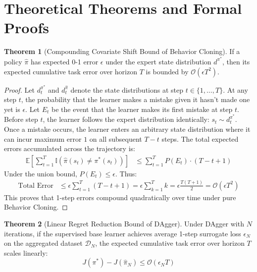 \documentclass[11pt,a4paper]{article}
\theoremstyle{definition}
\newtheorem{theorem}{\textbf{Theorem}}[section]
\begin{document}
\section{Theoretical Theorems and Formal Proofs}

\begin{theorem}[Compounding Covariate Shift Bound of Behavior Cloning]
If a policy $\hat{\pi}$ has expected 0-1 error $\epsilon$ under the expert state distribution $d^{\pi^*}$, then its expected cumulative task error over horizon $T$ is bounded by $\mathcal{O}(\epsilon T^2)$.
\end{theorem}

\begin{proof}
Let $d_t^{\pi^*}$ and $d_t^{\hat{\pi}}$ denote the state distributions at step $t \in \{1, \dots, T\}$.
At any step $t$, the probability that the learner makes a mistake given it hasn't made one yet is $\epsilon$.
Let $E_t$ be the event that the learner makes its first mistake at step $t$.
Before step $t$, the learner follows the expert distribution identically: $s_t \sim d_t^{\pi^*}$.
Once a mistake occurs, the learner enters an arbitrary state distribution where it can incur maximum error $1$ on all subsequent $T - t$ steps.
The total expected errors accumulated across the trajectory is:
{\boldmath
\begin{align}
\mathbb{E}\left[ \sum_{t=1}^T \mathbb{I}(\hat{\pi}(s_t) \ne \pi^*(s_t)) \right] &\le \sum_{t=1}^T P(E_t) \cdot (T - t + 1)
\end{align}
}
Under the union bound, $P(E_t) \le \epsilon$. Thus:
{\boldmath
\begin{align}
\text{Total Error} &\le \epsilon \sum_{t=1}^T (T - t + 1) = \epsilon \sum_{k=1}^T k = \epsilon \frac{T(T + 1)}{2} = \mathcal{O}(\epsilon T^2)
\end{align}
}
This proves that 1-step errors compound quadratically over time under pure Behavior Cloning.
\end{proof}

\begin{theorem}[Linear Regret Reduction Bound of DAgger]
Under DAgger with $N$ iterations, if the supervised base learner achieves average 1-step surrogate loss $\epsilon_N$ on the aggregated dataset $\mathcal{D}_N$, the expected cumulative task error over horizon $T$ scales linearly:
{\boldmath
\begin{equation}
J(\pi^*) - J(\hat{\pi}_N) \le \mathcal{O}(\epsilon_N T)
\end{equation}
}
\end{theorem}
\end{document}

